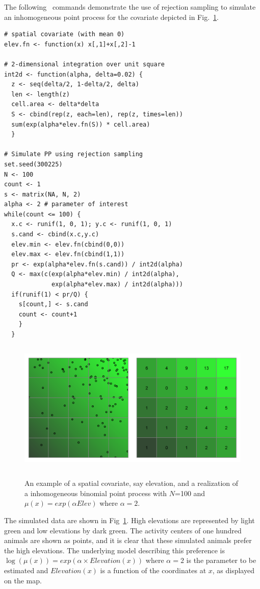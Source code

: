 The following \R~commands demonstrate the use of rejection sampling to
simulate an inhomogeneous point process for the covariate depicted in
Fig.~\ref{ch9:fig:hetero}.


\begin{small}
\begin{verbatim}
# spatial covariate (with mean 0)
elev.fn <- function(x) x[,1]+x[,2]-1

# 2-dimensional integration over unit square
int2d <- function(alpha, delta=0.02) {
  z <- seq(delta/2, 1-delta/2, delta)
  len <- length(z)
  cell.area <- delta*delta
  S <- cbind(rep(z, each=len), rep(z, times=len))
  sum(exp(alpha*elev.fn(S)) * cell.area)
  }

# Simulate PP using rejection sampling
set.seed(300225)
N <- 100
count <- 1
s <- matrix(NA, N, 2)
alpha <- 2 # parameter of interest
while(count <= 100) {
  x.c <- runif(1, 0, 1); y.c <- runif(1, 0, 1)
  s.cand <- cbind(x.c,y.c)
  elev.min <- elev.fn(cbind(0,0))
  elev.max <- elev.fn(cbind(1,1))
  pr <- exp(alpha*elev.fn(s.cand)) / int2d(alpha)
  Q <- max(c(exp(alpha*elev.min) / int2d(alpha),
             exp(alpha*elev.max) / int2d(alpha)))
  if(runif(1) < pr/Q) {
    s[count,] <- s.cand
    count <- count+1
    }
  }
\end{verbatim}
\end{small}


\begin{figure}
\centering
\includegraphics[width=5in,height=2.5in]{figs/heteroPlots}
\label{ch9:fig:hetero}
\caption{An example of a spatial covariate, say elevation, and a
  realization of a inhomogeneous binomial point process with $N$=100
  and $\mu(x) = exp(\alpha Elev)$ where $\alpha=2$.}
\end{figure}

The simulated data are shown in Fig~\ref{ch9:fig:hetero}. High elevations
are represented by light green and low elevations by dark green. The
activity centers of one hundred animals are shown as
points, and it is clear that these simulated animals prefer the high
elevations.  The underlying model describing this preference is
$\log(\mu(x)) = exp(\alpha \times Elevation(x))$
where $\alpha=2$ is the parameter to be estimated and $Elevation(x)$
is a function of the coordinates at $x$, as displayed on the map.

